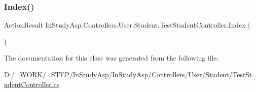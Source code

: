 \subsubsection{\texorpdfstring{Index()}{Index()}}
{\footnotesize\ttfamily Action\+Result In\+Study\+Asp.\+Controllers.\+User.\+Student.\+Test\+Student\+Controller.\+Index (\begin{DoxyParamCaption}{ }\end{DoxyParamCaption})}



The documentation for this class was generated from the following file\+:\begin{DoxyCompactItemize}
\item 
D\+:/\+\_\+\+W\+O\+R\+K/\+\_\+\+S\+T\+E\+P/\+In\+Study\+Asp/\+In\+Study\+Asp/\+Controllers/\+User/\+Student/\hyperlink{_test_student_controller_8cs}{Test\+Student\+Controller.\+cs}\end{DoxyCompactItemize}
